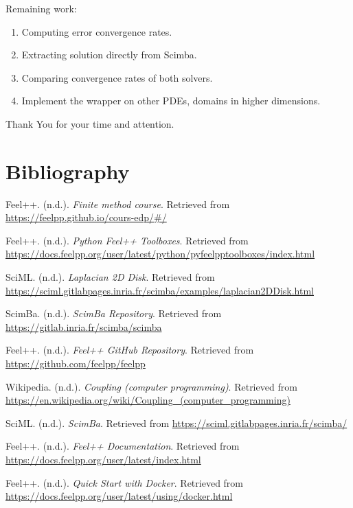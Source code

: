 \documentclass[12pt]{article}
\begin{document}
\begin{frame}
\begin{enumerate}
    \end{enumerate} 
\item Remaining work:
    \begin{enumerate}
        \item Computing error convergence rates.
        \item Extracting solution directly from Scimba.
        \item Comparing convergence rates of both solvers. 
        \item Implement the wrapper on other PDEs, domains in higher dimensions.          

    \end{enumerate}   

\begin{frame}{}
    \begin{center}
        Thank You for your time and attention.
    \end{center}
\end{frame}

\end{frame}
\newpage

\part*{Bibliography}



\begin{thebibliography}{14}

Feel++. (n.d.). \textit{Finite method course}. Retrieved from \url{https://feelpp.github.io/cours-edp/#/}

Feel++. (n.d.). \textit{Python Feel++ Toolboxes}. Retrieved from \url{https://docs.feelpp.org/user/latest/python/pyfeelpptoolboxes/index.html}


SciML. (n.d.). \textit{Laplacian 2D Disk}. Retrieved from \url{https://sciml.gitlabpages.inria.fr/scimba/examples/laplacian2DDisk.html}

ScimBa. (n.d.). \textit{ScimBa Repository}. Retrieved from \url{https://gitlab.inria.fr/scimba/scimba}

Feel++. (n.d.). \textit{Feel++ GitHub Repository}. Retrieved from \url{https://github.com/feelpp/feelpp}


Wikipedia. (n.d.). \textit{Coupling (computer programming)}. Retrieved from \url{https://en.wikipedia.org/wiki/Coupling_(computer_programming)}

SciML. (n.d.). \textit{ScimBa}. Retrieved from \url{https://sciml.gitlabpages.inria.fr/scimba/}

Feel++. (n.d.). \textit{Feel++ Documentation}. Retrieved from \url{https://docs.feelpp.org/user/latest/index.html}

Feel++. (n.d.). \textit{Quick Start with Docker}. Retrieved from \url{https://docs.feelpp.org/user/latest/using/docker.html}


\end{thebibliography}
\end{document}
